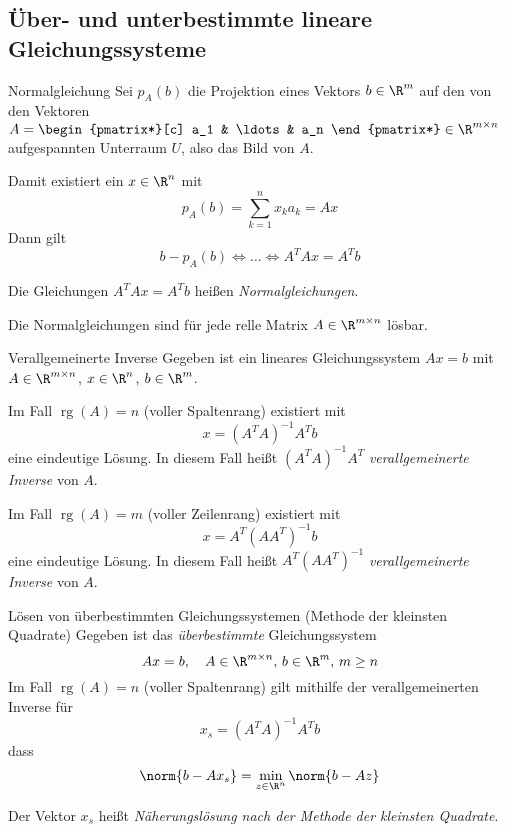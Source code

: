 \documentclass[german]{../spicker}
\newcommand{\vektor}[1]{\begin{pmatrix*}[c] #1 \end{pmatrix*}}
\newcommand{\rg}{\operatorname{rg}}
\begin{document}
\subsection{Über- und unterbestimmte lineare Gleichungssysteme}

\begin{defi}{Normalgleichung}
    Sei $p_A(b)$ die Projektion eines Vektors $b \in \R^m$ auf den von den Vektoren $A = \vektor{a_1 & \ldots & a_n} \in \R^{m\times n}$ aufgespannten Unterraum $U$, also das Bild von $A$.

    Damit existiert ein $x \in \R^n$ mit
    $$
        p_A(b) = \sum^n_{k=1} x_ka_k = Ax
    $$
    Dann gilt
    $$
        b - p_A(b) \iff \ldots \iff A^TAx = A^Tb
    $$

    Die Gleichungen $A^TAx = A^Tb$ heißen \emph{Normalgleichungen}.

    Die Normalgleichungen sind für jede relle Matrix $A \in \R^{m\times n}$ lösbar.

\end{defi}

\begin{defi}{Verallgemeinerte Inverse}
    Gegeben ist ein lineares Gleichungssystem $Ax=b$ mit $A \in \R^{m\times n}$, $x \in \R^n$, $b \in \R^m$.

    Im Fall $\rg(A) = n$ (voller Spaltenrang) existiert mit
    $$
        x = (A^TA)^{-1}A^Tb
    $$
    eine eindeutige Lösung.
    In diesem Fall heißt $(A^TA)^{-1}A^T$ \emph{verallgemeinerte Inverse} von $A$.

    Im Fall $\rg(A) = m$ (voller Zeilenrang) existiert mit
    $$
        x = A^T(AA^T)^{-1}b
    $$
    eine eindeutige Lösung.
    In diesem Fall heißt $A^T(AA^T)^{-1}$ \emph{verallgemeinerte Inverse} von $A$.
\end{defi}

\begin{algo}{Lösen von überbestimmten Gleichungssystemen (Methode der kleinsten Quadrate)}
    Gegeben ist das \emph{überbestimmte} Gleichungssystem
    $$
        Ax = b, \quad A \in \R^{m\times n}, \, b\in \R^m, \, m \geq n
    $$
    Im Fall $\rg(A) = n$ (voller Spaltenrang) gilt mithilfe der verallgemeinerten Inverse für
    $$
        x_s = (A^TA)^{-1}A^Tb
    $$
    dass
    $$
        \norm{b-Ax_s} = \min_{z\in\R^n} \norm{b-Az}
    $$

    Der Vektor $x_s$ heißt \emph{Näherungslösung nach der Methode der kleinsten Quadrate}.
\end{algo}
\end{document}
